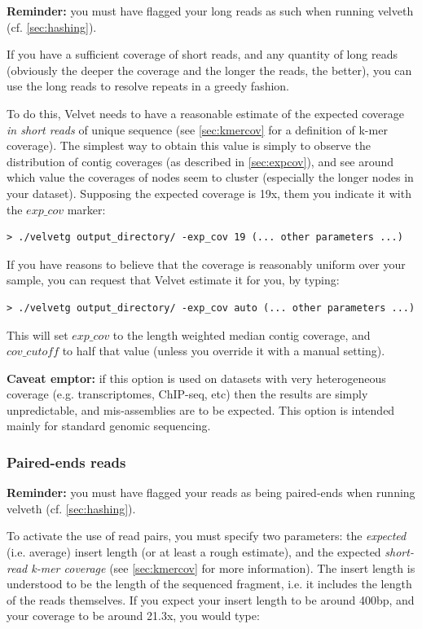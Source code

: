 \documentclass{article}
\begin{document}
\textbf{Reminder:} you must have flagged your long reads as such when running
velveth (cf. \ref{sec:hashing}).
	
If you have a sufficient coverage of short reads, and any quantity of long reads (obviously the deeper the coverage and the longer the reads, the better), you can use the long reads to resolve repeats in a greedy fashion. 

To do this, Velvet needs to have a reasonable estimate of the expected coverage \emph{in short reads} of unique sequence (see \ref{sec:kmercov} for a definition of k-mer coverage). The simplest way to obtain this value is simply to observe the distribution of contig coverages (as described in \ref{sec:expcov}), and see around which value the coverages of nodes seem to cluster (especially the longer nodes in your dataset). Supposing the expected coverage is 19x, them you indicate it with the $exp\_cov$ marker:

\begin{verbatim}
> ./velvetg output_directory/ -exp_cov 19 (... other parameters ...)
\end{verbatim}

If you have reasons to believe that the coverage is reasonably uniform over your sample, you can request that Velvet estimate it for you, by typing:

\begin{verbatim}
> ./velvetg output_directory/ -exp_cov auto (... other parameters ...)
\end{verbatim}

This will set $exp\_cov$ to the length weighted median contig coverage, and $cov\_cutoff$ to half that value (unless you override it with a manual setting).

\textbf{Caveat emptor:} if this option is used on datasets with very heterogeneous coverage (e.g. transcriptomes, ChIP-seq, etc) then the results are simply unpredictable, and mis-assemblies are to be expected. This option is intended mainly for standard genomic sequencing.

	\subsubsection{Paired-ends reads}

\textbf{Reminder:} you must have flagged your reads as being paired-ends when running
velveth (cf. \ref{sec:hashing}).

To activate the use of read pairs, you must specify two parameters: the \emph{expected} (i.e. average) insert length (or at least a rough estimate), and the expected \emph{short-read k-mer coverage} (see \ref{sec:kmercov} for more information). The insert length is understood to be the length of the sequenced fragment, i.e. it includes the length of the reads themselves. If you expect your insert length to be around 400bp, and your coverage to be around 21.3x, you would type:
\end{document}
